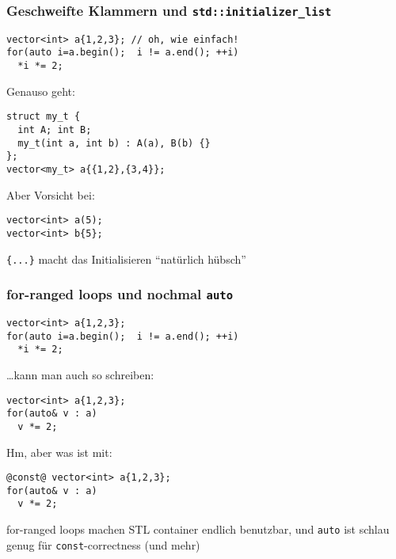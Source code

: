 \documentclass[t,ngerman,usepdftitle=false]{beamer}
\begin{document}
\begin{frame}[fragile]
  \frametitle{Geschweifte Klammern und \lstinline|std::initializer_list|}
\begin{lstlisting}
vector<int> a{1,2,3}; // oh, wie einfach!
for(auto i=a.begin();  i != a.end(); ++i)
  *i *= 2;
\end{lstlisting}

\pause
Genauso geht:
\begin{lstlisting}
struct my_t { 
  int A; int B;
  my_t(int a, int b) : A(a), B(b) {}
};
vector<my_t> a{{1,2},{3,4}};  
\end{lstlisting}

\pause
Aber {\color{red}Vorsicht} bei:\\
\begin{lstlisting}
vector<int> a(5);
vector<int> b{5};
\end{lstlisting}

\pause 
\begin{block}{}
  \centering
  \lstinline!{...}! macht das Initialisieren \enquote{natürlich hübsch}
\end{block}

\end{frame}


\begin{frame}[fragile]
  \frametitle{for-ranged loops und nochmal \lstinline!auto!}
\begin{lstlisting}
vector<int> a{1,2,3};
for(auto i=a.begin();  i != a.end(); ++i)
  *i *= 2;
\end{lstlisting}

\pause
\ldots{}kann man auch so schreiben:
\begin{lstlisting}
vector<int> a{1,2,3};
for(auto& v : a)
  v *= 2;
\end{lstlisting}

\pause
Hm, aber was ist mit:
\begin{lstlisting}
@const@ vector<int> a{1,2,3};
for(auto& v : a)
  v *= 2;
\end{lstlisting}

\pause
\begin{block}{}
  \centering
  for-ranged loops machen STL container endlich benutzbar,
  und \lstinline!auto! ist schlau genug für \lstinline!const!-correctness (und mehr)
\end{block}
  
\end{frame}
\end{document}
